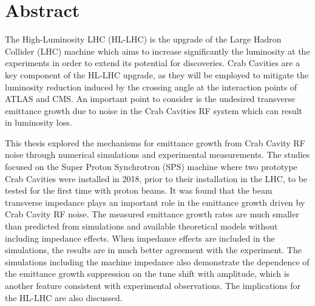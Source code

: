 \cleardoublepage
\chapter*{Abstract}


The High-Luminosity LHC (HL-LHC) is the upgrade of the Large Hadron Collider (LHC) machine which aims to increase significantly the luminosity at the experiments in order to extend its potential for discoveries. Crab Cavities are a key component of the HL-LHC upgrade, as they will be employed to mitigate the luminosity reduction induced by the crossing angle at the interaction points of ATLAS and CMS. An important point to consider is the undesired transverse emittance growth due to noise in the Crab Cavities RF system which can result in luminosity loss. 

This thesis explored the mechanisms for emittance growth from Crab Cavity RF noise through numerical simulations and experimental measurements. The studies focused on the Super Proton Synchrotron (SPS) machine where two prototype Crab Cavities were installed in 2018, prior to their installation in the LHC, to be tested for the first time with proton beams. It was found that the beam transverse impedance plays an important role in the emittance growth driven by Crab Cavity RF noise. The measured emittance growth rates are much smaller than predicted from simulations and available theoretical models without including impedance effects. When impedance effects are included in the simulations, the results are in much better agreement with the experiment. The simulations including the machine impedance also demonstrate the dependence of the emittance growth suppression on the tune shift with amplitude, which is another feature consistent with experimental observations. The implications for the HL-LHC are also discussed.





